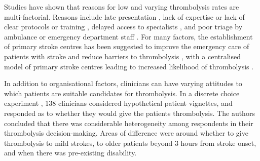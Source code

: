 Studies have shown that reasons for low and varying thrombolysis rates are multi-factorial. Reasons include late presentation \cite{aguiar_de_sousa_access_2019}, lack of expertise \cite{aguiar_de_sousa_access_2019} or lack of clear protocols or training \cite{carter-jones_stroke_2011}, delayed access to specialists \cite{kamal_delays_2017}, and poor triage by ambulance or emergency department staff \cite{carter-jones_stroke_2011}. For many factors, the establishment of primary stroke centres has been suggested to improve the emergency care of patients with stroke and reduce barriers to thrombolysis \cite{carter-jones_stroke_2011}, with a centralised model of primary stroke centres leading to increased likelihood of thrombolysis \cite{lahr_proportion_2012, morris_impact_2014, hunter_impact_2013}. 

In addition to organisational factors, clinicians can have varying attitudes to which patients are suitable candidates for thrombolysis. In a discrete choice experiment \cite{de_brun_factors_2018}, 138 clinicians considered hypothetical patient vignettes, and responded as to whether they would give the patients thrombolysis. The authors concluded that there was considerable heterogeneity among respondents in their thrombolysis decision-making. Areas of difference were around whether to give thrombolysis to mild strokes, to older patients beyond 3 hours from stroke onset, and when there was pre-existing disability.

